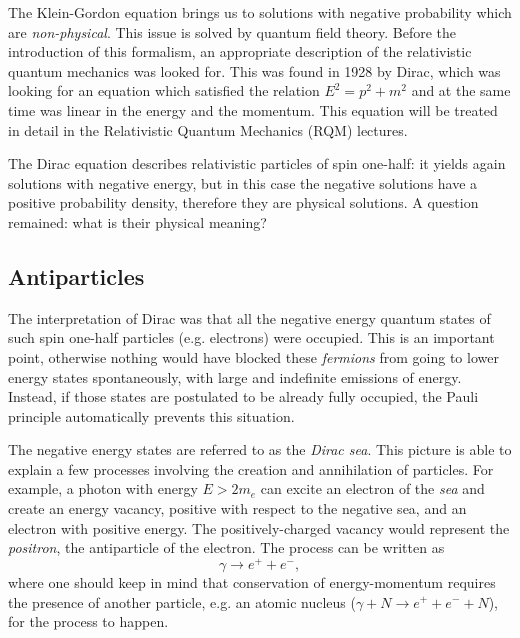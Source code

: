The Klein-Gordon equation brings us to solutions with negative probability which are \textit{non-physical}.
This issue is solved by quantum field theory. Before the introduction of this formalism, an appropriate description of the relativistic quantum mechanics was looked for. This was found in 1928 by Dirac, which was looking for an equation which satisfied the relation $E^2 = p^2 + m^2$ and at the same time was linear in the energy and the momentum. This equation will be treated in detail in the Relativistic Quantum Mechanics (RQM) lectures.

The Dirac equation describes relativistic particles of spin one-half: it yields again solutions with negative energy, but in this case the negative solutions have a positive probability density, therefore they are physical solutions. A question remained: what is their physical meaning?

\subsection{Antiparticles}
The interpretation of Dirac was that all the negative energy quantum states of such spin one-half particles (e.g. electrons) were occupied. This is an important point, otherwise nothing would have blocked these \emph{fermions} from going to lower energy states spontaneously, with large and indefinite emissions of energy. Instead, if those states are postulated to be already fully occupied, the Pauli principle automatically prevents this situation.

The negative energy states are referred to as the \textit{Dirac sea}. This picture is able to explain a few processes involving the creation and annihilation of particles. For example, a photon with energy $E > 2m_e$ can excite an electron of the \textit{sea} and create an energy vacancy, positive with respect to the negative sea, and an electron with positive energy. The positively-charged vacancy would represent the \emph{positron}, the antiparticle of the electron. The process can be written as
\begin{equation*}
    \gamma \rightarrow e^{+}+e^{-},
\end{equation*}
where one should keep in mind that conservation of energy-momentum requires the presence of another particle, e.g. an atomic nucleus ($\gamma+N\to e^+ +e^-+N$), for the process to happen.

